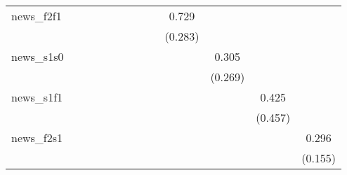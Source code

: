 {\begin{tabular}{l*{12}{c}}
\addlinespace
news\_f2f1   &                     &                     &                     &                     &                     &                     &                     &                     &       0.729\sym{**} &                     &                     &                     \\
            &                     &                     &                     &                     &                     &                     &                     &                     &     (0.283)         &                     &                     &                     \\
\addlinespace
news\_s1s0   &                     &                     &                     &                     &                     &                     &                     &                     &                     &       0.305         &                     &                     \\
            &                     &                     &                     &                     &                     &                     &                     &                     &                     &     (0.269)         &                     &                     \\
\addlinespace
news\_s1f1   &                     &                     &                     &                     &                     &                     &                     &                     &                     &                     &       0.425         &                     \\
            &                     &                     &                     &                     &                     &                     &                     &                     &                     &                     &     (0.457)         &                     \\
\addlinespace
news\_f2s1   &                     &                     &                     &                     &                     &                     &                     &                     &                     &                     &                     &       0.296\sym{*}  \\
            &                     &                     &                     &                     &                     &                     &                     &                     &                     &                     &                     &     (0.155)         \\

\end{tabular}}
